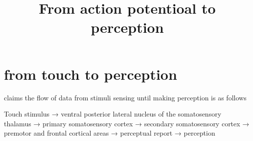 \documentclass[a4paper]{article}
\title{From action potentioal to perception}
\date{}
\begin{document}
\maketitle
    
    \section{from touch to perception}

    \cite{romo-2020-turning-touch-into-perception} claims the flow of data from stimuli sensing until making perception is as follows
    
    Touch stimulus → ventral posterior lateral nucleus of the somatosensory thalamus → primary somatosensory cortex → secondary somatosensory cortex → premotor and frontal cortical areas → perceptual report → perception
    
    
    
    
\end{document}
